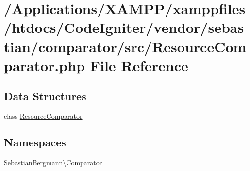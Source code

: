 \hypertarget{_resource_comparator_8php}{}\section{/\+Applications/\+X\+A\+M\+P\+P/xamppfiles/htdocs/\+Code\+Igniter/vendor/sebastian/comparator/src/\+Resource\+Comparator.php File Reference}
\label{_resource_comparator_8php}
\subsection*{Data Structures}
\begin{DoxyCompactItemize}
\item 
class \mbox{\hyperlink{class_sebastian_bergmann_1_1_comparator_1_1_resource_comparator}{Resource\+Comparator}}
\end{DoxyCompactItemize}
\subsection*{Namespaces}
\begin{DoxyCompactItemize}
\item 
 \mbox{\hyperlink{namespace_sebastian_bergmann_1_1_comparator}{Sebastian\+Bergmann\textbackslash{}\+Comparator}}
\end{DoxyCompactItemize}
